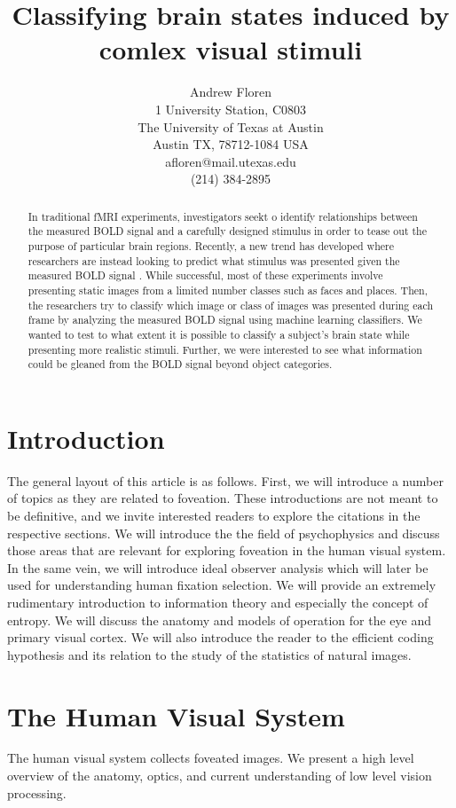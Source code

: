 \documentclass{article}
\title{Classifying brain states induced by comlex visual stimuli}
\author{Andrew Floren\\
1 University Station, C0803\\
The University of Texas at Austin\\
Austin TX, 78712-1084 USA\\
afloren@mail.utexas.edu\\
(214) 384-2895\\}
\date{}
\begin{document}
\maketitle

\begin{abstract}
In traditional fMRI experiments, investigators seekt o identify relationships between the measured BOLD signal and a carefully designed stimulus in order to tease out the purpose of particular brain regions.
Recently, a new trend has developed where researchers are instead looking to predict what stimulus was presented given the measured BOLD signal \cite{fmri-ml1,fmri-ml2,fmri-ml3}.
While successful, most of these experiments involve presenting static images from a limited number classes such as faces and places.
Then, the researchers try to classify which image or class of images was presented during each frame by analyzing the measured BOLD signal using machine learning classifiers.
We wanted to test to what extent it is possible to classify a subject's brain state while presenting more realistic stimuli.
Further, we were interested to see what information could be gleaned from the BOLD signal beyond object categories.

\end{abstract}

\tableofcontents

\section{Introduction}
The general layout of this article is as follows.
First, we will introduce a number of topics as they are related to foveation.
These introductions are not meant to be definitive, and we invite interested readers to explore the citations in the respective sections.
We will introduce the the field of psychophysics and discuss those areas that are relevant for exploring foveation in the human visual system.
In the same vein, we will introduce ideal observer analysis which will later be used for understanding human fixation selection.
We will provide an extremely rudimentary introduction to information theory and especially the concept of entropy.
We will discuss the anatomy and models of operation for the eye and primary visual cortex.
We will also introduce the reader to the efficient coding hypothesis and its relation to the study of the statistics of natural images.

\section{The Human Visual System}
The human visual system collects foveated images.
We present a high level overview of the anatomy, optics, and current understanding of low level vision processing.
\end{document}
